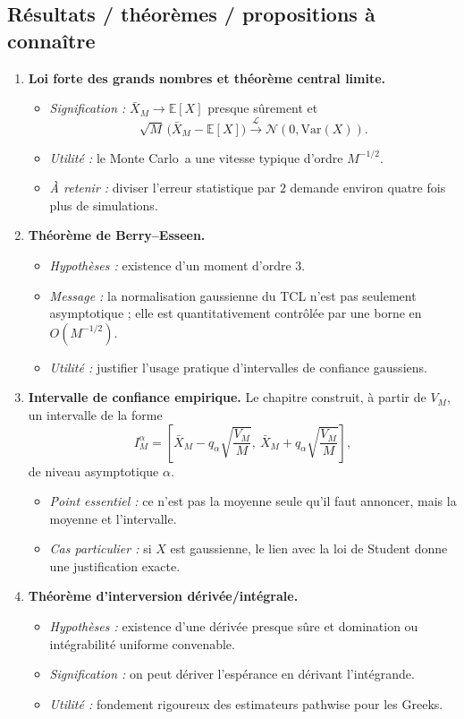 \documentclass[11pt,a4paper]{article}
\newcommand{\E}{\mathbb{E}}
\newcommand{\mc}{Monte Carlo}
\begin{document}
\subsection{Résultats / théorèmes / propositions à connaître}

\begin{enumerate}[label=\textbf{\arabic*.}]
  \item \textbf{Loi forte des grands nombres et théorème central limite.}
  \begin{itemize}
    \item \emph{Signification :} $\bar X_M\to \E[X]$ presque sûrement et
    \[
      \sqrt{M}\,\bigl(\bar X_M-\E[X]\bigr)\xrightarrow{\mathcal L}\mathcal N(0,\mathrm{Var}(X)).
    \]
    \item \emph{Utilité :} le \mc\ a une vitesse typique d'ordre $M^{-1/2}$.
    \item \emph{À retenir :} diviser l'erreur statistique par $2$ demande environ quatre fois plus de simulations.
  \end{itemize}

  \item \textbf{Théorème de Berry--Esseen.}
  \begin{itemize}
    \item \emph{Hypothèses :} existence d'un moment d'ordre $3$.
    \item \emph{Message :} la normalisation gaussienne du TCL n'est pas seulement asymptotique ; elle est quantitativement contrôlée par une borne en $O(M^{-1/2})$.
    \item \emph{Utilité :} justifier l'usage pratique d'intervalles de confiance gaussiens.
  \end{itemize}

  \item \textbf{Intervalle de confiance empirique.} Le chapitre construit, à partir de $V_M$, un intervalle de la forme
  \[
    I_M^\alpha=\left[\bar X_M-q_\alpha\sqrt{\frac{V_M}{M}},\ \bar X_M+q_\alpha\sqrt{\frac{V_M}{M}}\right],
  \]
  de niveau asymptotique $\alpha$.
  \begin{itemize}
    \item \emph{Point essentiel :} ce n'est pas la moyenne seule qu'il faut annoncer, mais la moyenne et l'intervalle.
    \item \emph{Cas particulier :} si $X$ est gaussienne, le lien avec la loi de Student donne une justification exacte.
  \end{itemize}

  \item \textbf{Théorème d'interversion dérivée/intégrale.}
  \begin{itemize}
    \item \emph{Hypothèses :} existence d'une dérivée presque sûre et domination ou intégrabilité uniforme convenable.
    \item \emph{Signification :} on peut dériver l'espérance en dérivant l'intégrande.
    \item \emph{Utilité :} fondement rigoureux des estimateurs pathwise pour les Greeks.
  \end{itemize}


\end{enumerate}
\end{document}
